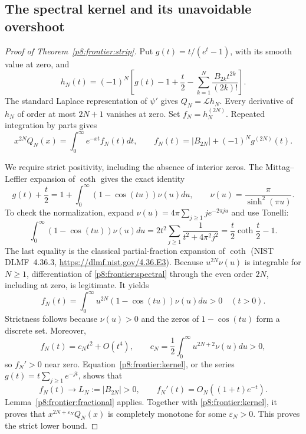 \documentclass[11pt,a4paper]{article}
\theoremstyle{definition}
\theoremstyle{remark}
\numberwithin{equation}{section}
\begin{document}
\subsection{The spectral kernel and its unavoidable overshoot}
\begin{proof}[Proof of Theorem~\ref{p8:frontier:strip}]
Put $g(t)=t/(e^t-1)$, with its smooth value at zero, and
\[
 h_N(t)=(-1)^N\left[g(t)-1+\frac t2
                   -\sum_{k=1}^N\frac{B_{2k}t^{2k}}{(2k)!}\right].
\]
The standard Laplace representation of $\psi'$ gives $Q_N=\mathcal Lh_N$.
Every derivative of $h_N$ of order at most $2N+1$ vanishes at zero.
Set $f_N=h_N^{(2N)}$. Repeated integration by parts gives
\begin{equation}
 x^{2N}Q_N(x)=\int_0^\infty e^{-xt}f_N(t)dt,
 \qquad
 f_N(t)=|B_{2N}|+(-1)^N g^{(2N)}(t).
 \label{p8:frontier:kernel}
\end{equation}

We require strict positivity, including the absence of interior zeros.
The Mittag--Leffler expansion of $\coth$ gives the exact identity
\begin{equation}
 g(t)+\frac t2
 =1+\int_0^\infty(1-\cos(tu))\nu(u)du,
 \qquad \nu(u)=\frac{\pi}{\sinh^2(\pi u)}.
 \label{p8:frontier:spectral}
\end{equation}
To check the normalization, expand
$\nu(u)=4\pi\sum_{j\geq1}j e^{-2\pi ju}$ and use Tonelli:
\[
 \int_0^\infty(1-\cos(tu))\nu(u)du
 =2t^2\sum_{j\geq1}\frac1{t^2+4\pi^2j^2}
 =\frac t2\coth\frac t2-1.
\]
The last equality is the classical partial-fraction expansion of $\coth$
(NIST DLMF~4.36.3, \url{https://dlmf.nist.gov/4.36.E3}).
Because $u^{2N}\nu(u)$ is integrable for $N\geq1$, differentiation
of \eqref{p8:frontier:spectral} through the even order $2N$, including at
zero, is legitimate. It yields
\begin{equation}
 f_N(t)=\int_0^\infty u^{2N}(1-\cos(tu))\nu(u)du>0\quad(t>0).
 \label{p8:frontier:strictpositive}
\end{equation}
Strictness follows because $\nu(u)>0$ and the zeros of $1-\cos(tu)$
form a discrete set. Moreover,
\[
 f_N(t)=c_Nt^2+O(t^4),\qquad
 c_N=\frac12\int_0^\infty u^{2N+2}\nu(u)du>0,
\]
so $f_N'>0$ near zero. Equation~\eqref{p8:frontier:kernel}, or the series
$g(t)=t\sum_{j\geq1}e^{-jt}$, shows that
\[
 f_N(t)\longrightarrow L_N:=|B_{2N}|>0,
 \qquad f_N'(t)=O_N((1+t)e^{-t}).
\]
Lemma~\ref{p8:frontier:fractional} applies. Together with
\eqref{p8:frontier:kernel}, it proves that $x^{2N+\varepsilon_N}Q_N(x)$ is
completely monotone for some $\varepsilon_N>0$. This proves the strict
lower bound.


\end{proof}
\end{document}
